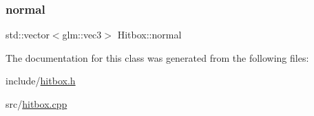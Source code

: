 \subsubsection{\texorpdfstring{normal}{normal}}
{\footnotesize\ttfamily std\+::vector$<$glm\+::vec3$>$ Hitbox\+::normal\hspace{0.3cm}{\ttfamily [private]}}



The documentation for this class was generated from the following files\+:\begin{DoxyCompactItemize}
\item 
include/\hyperlink{hitbox_8h}{hitbox.\+h}\item 
src/\hyperlink{hitbox_8cpp}{hitbox.\+cpp}\end{DoxyCompactItemize}
